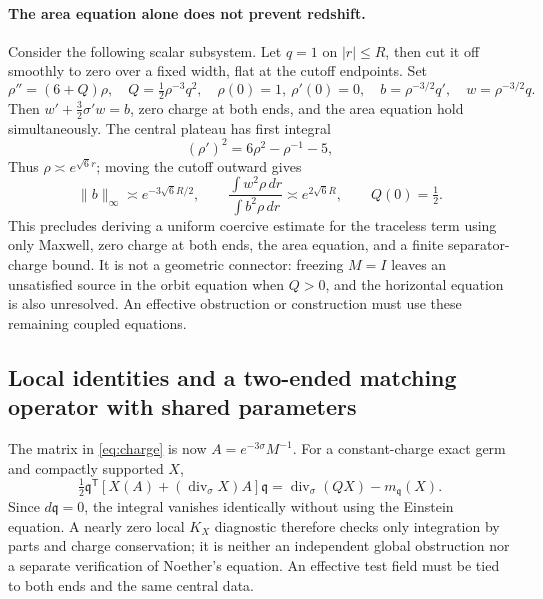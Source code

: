 \documentclass[a4paper,11pt]{article}
\numberwithin{equation}{section}
\theoremstyle{definition}
\begin{document}
\paragraph{The area equation alone does not prevent redshift.}
Consider the following scalar subsystem.
Let $q=1$ on $|r|\le R$, then cut it off smoothly to zero over a fixed width, flat at the cutoff endpoints.
Set
\[
 \rho''=(6+Q)\rho,\quad Q=\tfrac12\rho^{-3}q^2,
 \quad\rho(0)=1,\ \rho'(0)=0,
 \quad b=\rho^{-3/2}q',\quad w=\rho^{-3/2}q.
\]
Then $w'+\frac32\sigma'w=b$, zero charge at both ends, and the area equation hold simultaneously.
The central plateau has first integral
\[
 (\rho')^2=6\rho^2-\rho^{-1}-5,
\]
Thus $\rho\asymp e^{\sqrt6r}$; moving the cutoff outward gives
\[
 \|b\|_\infty\asymp e^{-3\sqrt6R/2},
 \qquad
 \frac{\int w^2\rho\,dr}{\int b^2\rho\,dr}\asymp e^{2\sqrt6R},
 \qquad Q(0)=\tfrac12.
\]
This precludes deriving a uniform coercive estimate for the traceless term using only Maxwell, zero charge at both ends, the area equation, and a finite separator-charge bound.
It is not a geometric connector: freezing $M=I$ leaves an unsatisfied source in the orbit equation when $Q>0$, and the horizontal equation is also unresolved.
An effective obstruction or construction must use these remaining coupled equations.

\subsection{Local identities and a two-ended matching operator with shared parameters}
The matrix in \eqref{eq:charge} is now $A=e^{-3\sigma}M^{-1}$.
For a constant-charge exact germ and compactly supported $X$,
\[
 \tfrac12\mathfrak q^{\mathsf T}
  [X(A)+(\operatorname{div}_\sigma X)A]\mathfrak q
 =\operatorname{div}_\sigma(QX)-m_{\mathfrak q}(X).
\]
Since $d\mathfrak q=0$, the integral vanishes identically without using the Einstein equation.
A nearly zero local $K_X$ diagnostic therefore checks only integration by parts and charge conservation; it is neither an independent global obstruction nor a separate verification of Noether's equation.
An effective test field must be tied to both ends and the same central data.
\end{document}
